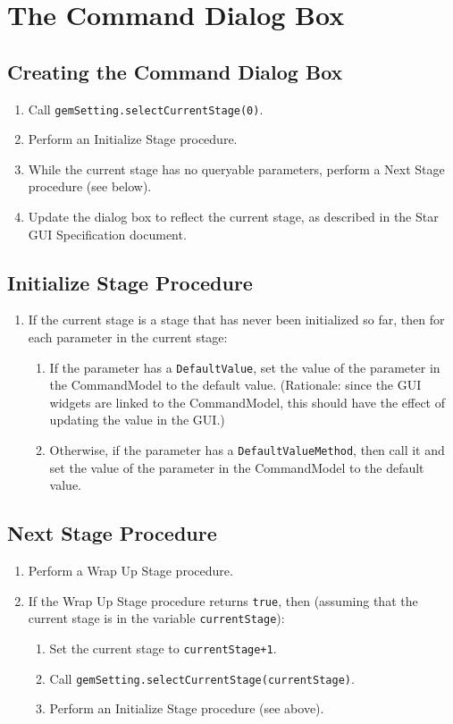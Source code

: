 \documentclass[11pt]{article}
\begin{document}
\section{The Command Dialog Box}

\subsection{Creating the Command Dialog Box}

\begin{enumerate}
\item Call {\tt gemSetting.selectCurrentStage(0)}.
\item Perform an Initialize Stage procedure.
\item While the current stage has no queryable parameters, perform
  a Next Stage procedure (see below).
\item Update the dialog box to reflect the current stage, as described
  in the Star GUI Specification document.
\end{enumerate}

\subsection{Initialize Stage Procedure}

\begin{enumerate}
\item If the current stage is a stage that has never been initialized so far,
  then for each parameter in the current stage:
  \begin{enumerate}
  \item If the parameter has a {\tt DefaultValue}, set the value of the
    parameter in the CommandModel to the default value.
    (Rationale:  since the GUI widgets are linked to the CommandModel,
    this should have the effect of updating the value in the GUI.)
  \item Otherwise, if the parameter has a {\tt DefaultValueMethod}, then call it
    and set the value of the parameter in the CommandModel to the default
    value.
  \end{enumerate}
\end{enumerate}

\subsection{Next Stage Procedure}

\begin{enumerate}
\item Perform a Wrap Up Stage procedure.
\item If the Wrap Up Stage procedure returns {\tt true}, then (assuming
  that the current stage is in the variable {\tt currentStage}):
  \begin{enumerate}
  \item Set the current stage to \verb/currentStage+1/.
  \item Call {\tt gemSetting.selectCurrentStage(currentStage)}.
  \item Perform an Initialize Stage procedure (see above).
  \end{enumerate}
\end{enumerate}
\end{document}
